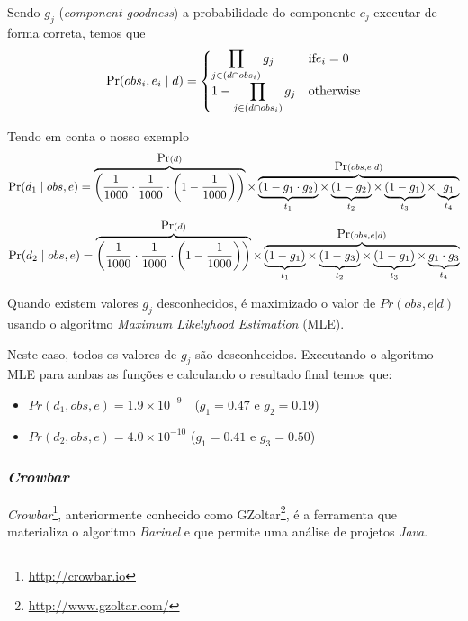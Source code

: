 Sendo $g_j$ (\emph{component goodness}) a probabilidade do componente $c_j$ executar de forma correta, temos que
% 
\begin{equation}
  \mbox{Pr}(obs_i, e_i \mid  d) = 
  \begin{cases}
    \displaystyle\prod_{j \in (d \cap obs_i)} g_j 		& \textrm{if} e_i = 0 \\
	1 - \displaystyle\prod_{j \in (d \cap obs_i)} g_j  & \textrm{otherwise}
  \end{cases}
\end{equation}

Tendo em conta o nosso exemplo
%
\begin{equation}
    \mbox{Pr}(d_1 \mid obs,e) =
    \overbrace{\bigg(\frac{1}{1000} \cdot \frac{1}{1000} \cdot \bigg(1 - \frac{1}{1000}\bigg)\bigg)}^{\mbox{Pr}(d)}
    \times
    \overbrace{
      \underbrace{(1-g_1 \cdot g_2)}_{t_1}
      \times
      \underbrace{(1-g_2)}_{t_2}
      \times
      \underbrace{(1-g_1)}_{t_3}
      \times
      \underbrace{g_1}_{t_4}
    }^{\mbox{Pr}(obs,e \mid d)}
\end{equation}
%
\begin{equation}
    \mbox{Pr}(d_2 \mid obs,e) =
    \overbrace{\bigg(\frac{1}{1000} \cdot \frac{1}{1000} \cdot \bigg(1 - \frac{1}{1000}\bigg)\bigg)}^{\mbox{Pr}(d)}
    \times
    \overbrace{
      \underbrace{(1-g_1)}_{t_1}
      \times
      \underbrace{(1-g_3)}_{t_2}
      \times
      \underbrace{(1-g_1)}_{t_3}
      \times
      \underbrace{g_1 \cdot g_3}_{t_4}
    }^{\mbox{Pr}(obs,e \mid d)}
\end{equation}


Quando existem valores $g_j$ desconhecidos, é maximizado o valor de $Pr(obs, e | d)$ usando o algoritmo \emph{Maximum Likelyhood Estimation} (MLE).

Neste caso, todos os valores de $g_j$ são desconhecidos. Executando o algoritmo MLE para ambas as funções e calculando o resultado final temos que:
%
\begin{itemize}
\item $Pr(d_1, obs, e) = 1.9 \times 10^{-9}$\ \ ($g_1 = 0.47$ e $g_2 = 0.19$)
\item $Pr(d_2, obs, e) = 4.0 \times 10^{-10}$ ($g_1 = 0.41$ e $g_3 = 0.50$)
\end{itemize}


% 
%
\subsubsection{\emph{Crowbar}}

\emph{Crowbar}\footnote{ \url{http://crowbar.io}}, anteriormente conhecido como GZoltar\footnote{ \url{http://www.gzoltar.com/}}, é a ferramenta que materializa o algoritmo \emph{Barinel} e que permite uma análise de projetos \emph{Java}. 

